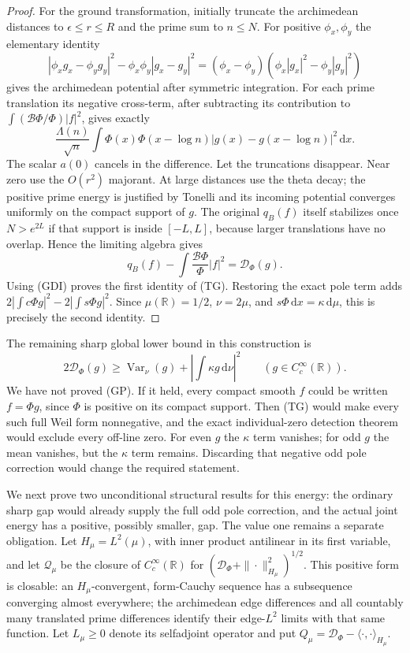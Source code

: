 \documentclass[11pt]{article}
\theoremstyle{remark}\newtheorem{remark}[theorem]{Remark}
\newcommand{\R}{\mathbb R}
\newcommand{\dd}{\,\mathrm d}
\begin{document}
\begin{proof}
For the ground transformation, initially truncate the archimedean
distances to $\epsilon\le r\le R$ and the prime sum to $n\le N$.
For positive $\phi_x,\phi_y$ the elementary identity
\[
 |\phi_x g_x-\phi_y g_y|^2
 -\phi_x\phi_y|g_x-g_y|^2
 =(\phi_x-\phi_y)
                   (\phi_x|g_x|^2-\phi_y|g_y|^2)
\]
gives the archimedean potential after symmetric integration.
For each prime translation its negative cross-term, after
subtracting its contribution to
$\int(\mathcal B\Phi/\Phi)|f|^2$, gives exactly
\[
 \frac{\Lambda(n)}{\sqrt n}
 \int\Phi(x)\Phi(x-\log n)
                         |g(x)-g(x-\log n)|^2\dd x.
\]
The scalar $a(0)$ cancels in the difference.
Let the truncations disappear. Near zero use the $O(r^2)$
majorant. At large distances use the theta decay; the positive
prime energy is justified by Tonelli and its incoming potential
converges uniformly on the compact support of $g$.
The original $q_B(f)$ itself stabilizes once $N>e^{2L}$
if that support is inside $[-L,L]$, because larger translations
have no overlap. Hence the limiting algebra gives
\[
 q_B(f)-\int\frac{\mathcal B\Phi}{\Phi}|f|^2
                                     =\mathcal D_\Phi(g).
\]
Using (GDI) proves the first identity of (TG).
Restoring the exact pole term adds
$2|\int c\Phi g|^2-2|\int s\Phi g|^2$.
Since $\mu(\R)=1/2$, $\nu=2\mu$, and
$s\Phi\dd x=\kappa\dd\mu$, this is precisely the second identity.
\end{proof}

The remaining sharp global lower bound in this construction is
\[
 2\mathcal D_\Phi(g)\ge
       \operatorname{Var}_\nu(g)
                 +\left|\int\kappa g\dd\nu\right|^2
                  \qquad(g\in C_c^\infty(\R)).             \tag{GP}
\]
We have not proved (GP).
If it held, every compact smooth $f$ could be written
$f=\Phi g$, since $\Phi$ is positive on its compact support.
Then (TG) would make every such full Weil form nonnegative,
and the exact individual-zero detection theorem would exclude
every off-line zero. For even $g$ the $\kappa$ term vanishes;
for odd $g$ the mean vanishes, but the $\kappa$ term remains.
Discarding that negative odd pole correction would change the
required statement.

We next prove two unconditional structural results for this energy:
the ordinary sharp gap would already supply the full odd pole
correction, and the actual joint energy has a positive, possibly
smaller, gap. The value one remains a separate obligation.
Let $H_\mu=L^2(\mu)$, with inner product antilinear in its first
variable, and let $\mathcal Q_\mu$ be the closure of
$C_c^\infty(\R)$ for
$(\mathcal D_\Phi+\|\cdot\|_{H_\mu}^2)^{1/2}$.
This positive form is closable: an $H_\mu$-convergent,
form-Cauchy sequence has a subsequence converging almost everywhere;
the archimedean edge differences and all countably many translated
prime differences identify their edge-$L^2$ limits with that same
function. Let $L_\mu\ge0$ denote its selfadjoint operator and put
$Q_\mu=\mathcal D_\Phi-\langle\cdot,\cdot\rangle_{H_\mu}$.
\end{document}
